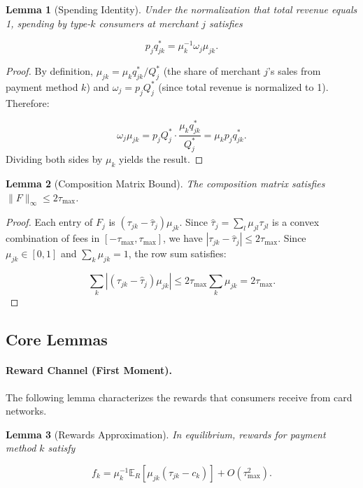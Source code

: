 \documentclass[11pt,english]{article}
\newtheorem{lemma}{Lemma}
\theoremstyle{remark}
\begin{document}
\begin{lemma}[Spending Identity]\label{lem:spending-identity}
Under the normalization that total revenue equals 1, spending by type-$k$ consumers at merchant $j$ satisfies

\[
p_j q_{jk}^* = \mu_k^{-1} \omega_j \mu_{jk}.
\]
\end{lemma}

\begin{proof}
By definition, $\mu_{jk} = \mu_k q_{jk}^* / Q_j^*$ (the share of merchant $j$'s sales from payment method $k$) and $\omega_j = p_j Q_j^*$ (since total revenue is normalized to 1).
Therefore:

\[
\omega_j \mu_{jk} = p_j Q_j^* \cdot \frac{\mu_k q_{jk}^*}{Q_j^*} = \mu_k p_j q_{jk}^*.
\]
Dividing both sides by $\mu_k$ yields the result.

\end{proof}

\begin{lemma}[Composition Matrix Bound]\label{lem:F-bound}
The composition matrix satisfies $\|F\|_\infty \leq 2\tau_{\max}$.

\end{lemma}

\begin{proof}
Each entry of $F_j$ is $(\tau_{jk} - \hat{\tau}_j)\mu_{jk}$.
Since $\hat{\tau}_j = \sum_l \mu_{jl}\tau_{jl}$ is a convex combination of fees in $[-\tau_{\max}, \tau_{\max}]$, we have $|\tau_{jk} - \hat{\tau}_j| \leq 2\tau_{\max}$.
Since $\mu_{jk} \in [0,1]$ and $\sum_k \mu_{jk} = 1$, the row sum satisfies:

\[
\sum_k |(\tau_{jk} - \hat{\tau}_j)\mu_{jk}| \leq 2\tau_{\max} \sum_k \mu_{jk} = 2\tau_{\max}.
\]
\end{proof}

\subsection{Core Lemmas}\label{subsec:core-lemmas}

\paragraph{Reward Channel (First Moment).}
The following lemma characterizes the rewards that consumers receive from card networks.

\begin{lemma}[Rewards Approximation]\label{lem:rewards-approx}
In equilibrium, rewards for payment method $k$ satisfy

\[
f_k = \mu_k^{-1} \mathbb{E}_R[\mu_{jk}(\tau_{jk} - c_k)] + O(\tau_{\max}^2).
\]
\end{lemma}
\end{document}
